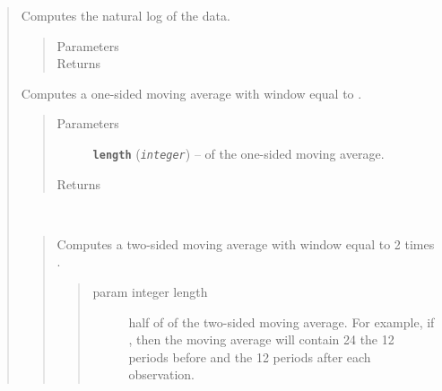 \documentclass[letterpaper,10pt,english]{sphinxmanual}
\begin{document}
\begin{fulllineitems}
\begin{quote}

\begin{fulllineitems}
\label{series_class:fredpy.series.log}
Computes the natural log of the data.
\begin{quote}\begin{description}
\item[{Parameters}] \leavevmode
\item[{Returns}] \leavevmode
{\hyperref[series_class:fredpy.series]{}}

\end{description}\end{quote}

\end{fulllineitems}


\begin{fulllineitems}
\label{series_class:fredpy.series.ma1side}
Computes a one-sided moving average with window equal to .
\begin{quote}\begin{description}
\item[{Parameters}] \leavevmode
\textbf{\texttt{length}} (\emph{\texttt{integer}}) --  of the one-sided moving average.

\item[{Returns}] \leavevmode
{\hyperref[series_class:fredpy.series]{}}

\end{description}\end{quote}

\end{fulllineitems}


\begin{fulllineitems}
\label{series_class:fredpy.series.ma2side}~\begin{quote}

Computes a two-sided moving average with window equal to 2 times .
\begin{quote}\begin{description}
\item[{param integer length}] \leavevmode
half of  of the two-sided moving average. For example, if , then the moving average will contain 24 the 12 periods before and the 12 periods after each observation.


\end{description}
\end{quote}
\end{quote}
\end{fulllineitems}
\end{quote}
\end{fulllineitems}
\end{document}
